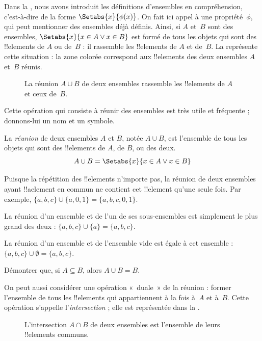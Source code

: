 \documentclass[../../../include/open-logic-section]{subfiles}
\begin{document}

\begin{explain}
Dans la , nous avons introduit les définitions
d'ensembles en compréhension, c'est-à-dire de la forme
$\Setabs{x}{\phi(x)}$. On fait ici appel à une propriété~$\phi$,
qui peut mentionner des ensembles déjà définis. Ainsi, si $A$ et~$B$
sont des ensembles, $\Setabs{x}{x \in A \lor x \in B}$ est formé
de tous les objets qui sont des !!{element}s de $A$ ou de~$B$ :
il rassemble les !!{element}s de $A$ et de~$B$.
La  représente cette situation : la zone colorée
correspond aux !!{element}s des deux ensembles $A$ et~$B$ réunis.

\begin{figure}
  \caption{La réunion $A \cup B$ de deux ensembles rassemble
    les !!{element}s de $A$ et ceux de~$B$.}
\end{figure}

Cette opération qui consiste à réunir des ensembles est très
utile et fréquente ; donnons-lui un nom et un symbole.
\end{explain}

\begin{defn}[Réunion]
La \emph{réunion} de deux ensembles $A$ et $B$, notée $A \cup B$,
est l'ensemble de tous les objets qui sont des !!{element}s
de $A$, de $B$, ou des deux.
\[
A \cup B = \Setabs{x}{x \in A \lor x \in B}
\]
\end{defn}

\begin{ex}
Puisque la répétition des !!{element}s n'importe pas, la réunion de
deux ensembles ayant !!a{element} en commun ne contient cet
!!{element} qu'une seule fois. Par exemple,
$\{ a, b, c\} \cup \{ a, 0, 1\} = \{a, b, c, 0, 1\}$.

La réunion d'un ensemble et de l'un de ses sous-ensembles est
simplement le plus grand des deux :
$\{a, b, c \} \cup \{a \} = \{a, b, c\}$.

La réunion d'un ensemble et de l'ensemble vide est égale à
cet ensemble : $\{a, b, c \} \cup \emptyset = \{a, b, c \}$.
\end{ex}

\begin{prob}
Démontrer que, si $A \subseteq B$, alors $A \cup B = B$.
\end{prob}

\begin{explain}
On peut aussi considérer une opération «~duale~» de la réunion :
former l'ensemble de tous les !!{element}s qui appartiennent
à la fois à~$A$ et à~$B$. Cette opération s'appelle
l'\emph{intersection} ; elle est représentée dans
la .
\begin{figure}
  \caption{L'intersection $A \cap B$ de deux ensembles est
    l'ensemble de leurs !!{element}s communs.}
\end{figure}
\end{explain}
\end{document}
